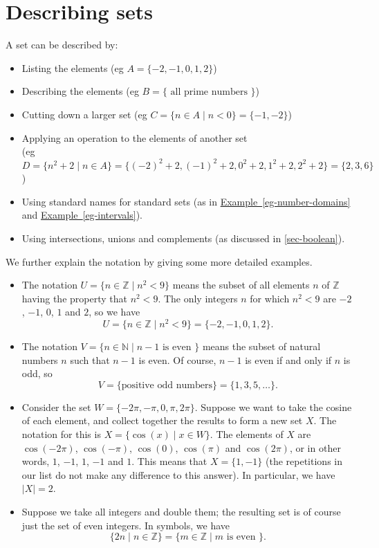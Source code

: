 \documentclass[a4paper]{book}
\newcommand{\N}         {{\mathbb{N}}}
\newcommand{\Z}         {{\mathbb{Z}}}
\newcommand{\st}        {\;|\;}
\renewcommand{\:}{\colon}
\newcommand{\biref}[2]{\hyperlink{#2}{#1~\ref*{#2}}}
\theoremstyle{definition}
\begin{document}
\section{Describing sets}\label{sec-sets-desc}

A set can be described by:
\begin{itemize}
 \item Listing the elements (eg $A=\{-2,-1,0,1,2\}$)
 \item Describing the elements 
  (eg $B=\{\text{ all prime numbers }\}$)
 \item Cutting down a larger set
  (eg $C=\{n\in A\st n<0\}=\{-1,-2\}$)
 \item Applying an operation to the elements of another set \\
  (eg $D=\{n^2+2\st n\in A\}=\{(-2)^2+2,(-1)^2+2,0^2+2,1^2+2,2^2+2\}=\{2,3,6\}$)
 \item Using standard names for standard sets (as in
  \biref{Example}{eg-number-domains} and \biref{Example}{eg-intervals}).
 \item Using intersections, unions and complements (as discussed in
  \autoref{sec-boolean}).
\end{itemize}

We further explain the notation by giving some more detailed
examples. 
\begin{itemize}
 \item The notation $U=\{n\in\Z\st n^2<9\}$ means the subset of all
  elements $n$ of $\Z$ having the property that $n^2<9$.  The only
  integers $n$ for which $n^2<9$ are $-2$, $-1$, $0$, $1$ and $2$, so
  we have
  \[ U = \{n\in\Z\st n^2<9\} = \{-2,-1,0,1,2\}. \]
 \item The notation $V=\{n\in\N\st n-1\text{ is even }\}$ means the
  subset of natural numbers $n$ such that $n-1$ is even.  Of course,
  $n-1$ is even if and only if $n$ is odd, so
  \[ V=\{\text{positive odd numbers}\} = \{1,3,5,\ldots\}. \]
 \item Consider the set $W=\{-2\pi,-\pi,0,\pi,2\pi\}$.  Suppose we
  want to take the cosine of each element, and collect together the
  results to form a new set $X$.  The notation for this is
  $X=\{\cos(x)\st x\in W\}$.  The elements of $X$ are 
  $\cos(-2\pi)$, $\cos(-\pi)$, $\cos(0)$, $\cos(\pi)$ and
  $\cos(2\pi)$, or in other words, $1$, $-1$, $1$, $-1$ and $1$.  This
  means that $X=\{1,-1\}$ (the repetitions in our list do not make any
  difference to this answer).  In particular, we have $|X|=2$.
 \item Suppose we take all integers and double them; the resulting
  set is of course just the set of even integers.  In symbols, we
  have
  \[ \{2n\st n\in\Z\} = \{m\in\Z\st m \text{ is even }\}. \]
\end{itemize}
\end{document}
